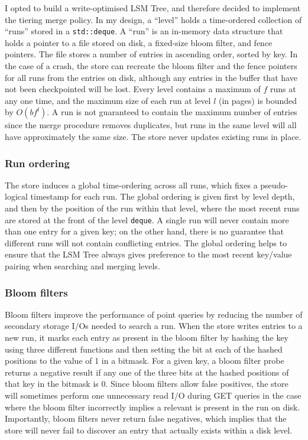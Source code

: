 \documentclass{acm}
\begin{document}
I opted to build a write-optimised LSM Tree, and therefore decided to implement the tiering merge policy. In my design, a ``level'' holds a time-ordered collection of ``runs'' stored in a \texttt{std::deque}. A ``run'' is an in-memory data structure that holds a pointer to a file stored on disk, a fixed-size bloom filter, and fence pointers. The file stores a number of entries in ascending order, sorted by key. In the case of a crash, the store can recreate the bloom filter and the fence pointers for all runs from the entries on disk, although any entries in the buffer that have not been checkpointed will be lost. Every level contains a maximum of $f$ runs at any one time, and the maximum size of each run at level $l$ (in pages) is bounded by $O(bf^l)$. A run is not guaranteed to contain the maximum number of entries since the merge procedure removes duplicates, but runs in the same level will all have approximately the same size. The store never updates existing runs in place.

\subsubsection{Run ordering}

The store induces a global time-ordering across all runs, which fixes a pseudo-logical timestamp for each run. The global ordering is given first by level depth, and then by the position of the run within that level, where the most recent runs are stored at the front of the level \texttt{deque}. A single run will never contain more than one entry for a given key; on the other hand, there is no guarantee that different runs will not contain conflicting entries. The global ordering helps to ensure that the LSM Tree always gives preference to the most recent key/value pairing when searching and merging levels.

\subsubsection{Bloom filters}

Bloom filters improve the performance of point queries by reducing the number of secondary storage I/Os needed to search a run. When the store writes entries to a new run, it marks each entry as present in the bloom filter by hashing the key using three different functions and then setting the bit at each of the hashed positions to the value of 1 in a bitmask. For a given key, a bloom filter probe returns a negative result if any one of the three bits at the hashed positions of that key in the bitmask is 0. Since bloom filters allow false positives, the store will sometimes perform one unnecessary read I/O during GET queries in the case where the bloom filter incorrectly implies a relevant is present in the run on disk. Importantly, bloom filters never return false negatives, which implies that the store will never fail to discover an entry that actually exists within a disk level.
\end{document}
